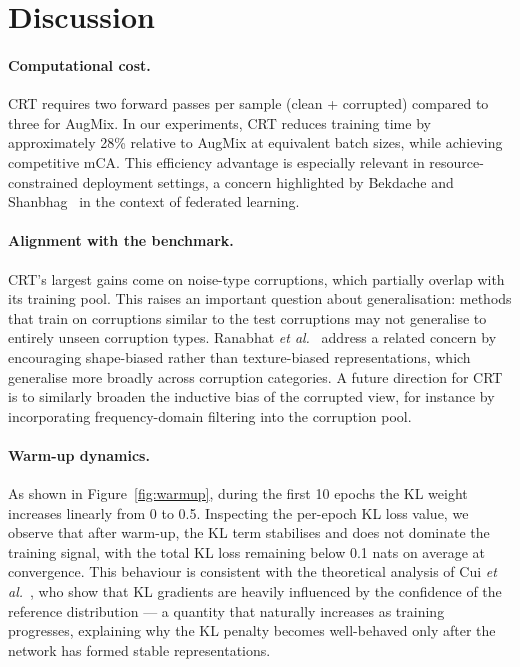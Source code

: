 \documentclass[10pt,twocolumn]{article}
\begin{document}
\section{Discussion}

\paragraph{Computational cost.} CRT requires two forward passes per sample (clean + corrupted) compared to three for AugMix. In our experiments, CRT reduces training time by approximately 28\% relative to AugMix at equivalent batch sizes, while achieving competitive mCA. This efficiency advantage is especially relevant in resource-constrained deployment settings, a concern highlighted by Bekdache and Shanbhag~\cite{bekdache2025federl} in the context of federated learning.

\paragraph{Alignment with the benchmark.} CRT's largest gains come on noise-type corruptions, which partially overlap with its training pool. This raises an important question about generalisation: methods that train on corruptions similar to the test corruptions may not generalise to entirely unseen corruption types. Ranabhat \emph{et al.}~\cite{ranabhat2025shapebias} address a related concern by encouraging shape-biased rather than texture-biased representations, which generalise more broadly across corruption categories. A future direction for CRT is to similarly broaden the inductive bias of the corrupted view, for instance by incorporating frequency-domain filtering into the corruption pool.

\paragraph{Warm-up dynamics.} As shown in Figure~\ref{fig:warmup}, during the first 10 epochs the KL weight increases linearly from 0 to 0.5. Inspecting the per-epoch KL loss value, we observe that after warm-up, the KL term stabilises and does not dominate the training signal, with the total KL loss remaining below 0.1 nats on average at convergence. This behaviour is consistent with the theoretical analysis of Cui \emph{et al.}~\cite{cui2025gkl}, who show that KL gradients are heavily influenced by the confidence of the reference distribution --- a quantity that naturally increases as training progresses, explaining why the KL penalty becomes well-behaved only after the network has formed stable representations.
\end{document}

